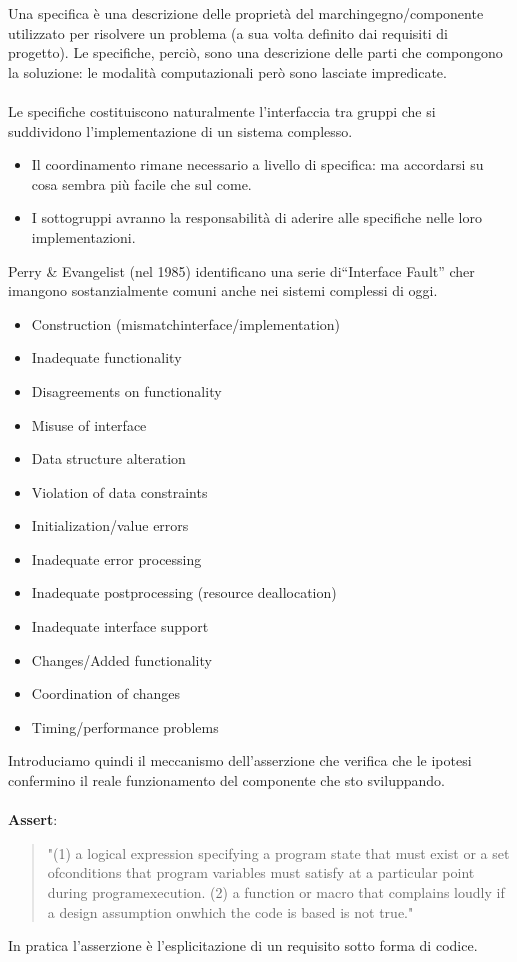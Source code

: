 \noindent Una specifica è una descrizione delle proprietà del marchingegno/componente utilizzato per risolvere un problema (a sua volta definito dai requisiti di progetto). Le specifiche, perciò, sono una descrizione delle parti che compongono la soluzione: le modalità computazionali però sono lasciate impredicate.\\\\

\noindent Le specifiche costituiscono naturalmente l'interfaccia tra gruppi che si suddividono l'implementazione di un sistema complesso.
\begin{itemize}
    \item Il coordinamento rimane necessario a livello di specifica: ma accordarsi su cosa sembra più facile che sul come.
    \item I sottogruppi avranno la responsabilità di aderire alle specifiche nelle loro implementazioni.
\end{itemize}

\noindent Perry \& Evangelist (nel 1985) identificano una serie di“Interface Fault” cher imangono sostanzialmente comuni anche nei sistemi complessi di oggi.
\begin{itemize}
    \item Construction (mismatchinterface/implementation)
    \item Inadequate functionality
    \item Disagreements on functionality
    \item Misuse of interface
    \item Data structure alteration
    \item Violation of data constraints
    \item Initialization/value errors
    \item Inadequate error processing
    \item Inadequate postprocessing (resource deallocation)
    \item Inadequate interface support
    \item Changes/Added functionality
    \item Coordination of changes
    \item Timing/performance problems
\end{itemize}

\noindent Introduciamo quindi il meccanismo dell'asserzione che verifica che le ipotesi confermino il reale funzionamento del componente che sto sviluppando.\\\\
\textbf{Assert}: \begin{quote} "(1) a logical expression specifying a program state that must exist or a set ofconditions that program variables must satisfy at a particular point during programexecution.  (2) a function or macro that complains loudly if a design assumption onwhich the code is based is not true." \end{quote}
In pratica l'asserzione è l'esplicitazione di un requisito sotto forma di codice.


